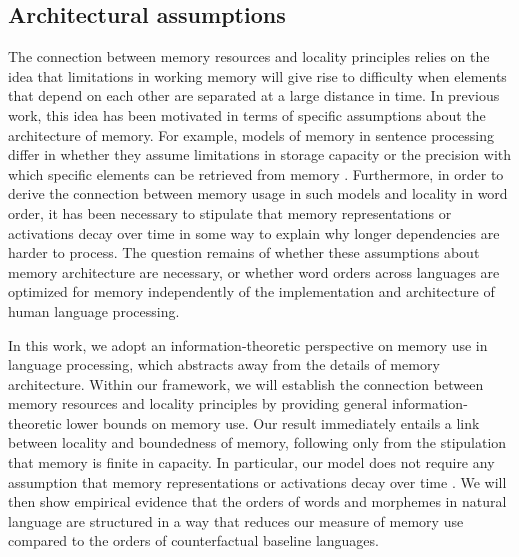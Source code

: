 \subsection{Architectural assumptions}

The connection between memory resources and locality principles relies on the idea that limitations in working memory will give rise to difficulty when elements that depend on each other are separated at a large distance in time. In previous work, this idea has been motivated in terms of specific assumptions about the architecture of memory. For example, models of memory in sentence processing differ in whether they assume limitations in storage capacity \citep[e.g., `memory cost' in the model of][]{gibson1998linguistic} or the precision with which specific elements can be retrieved from memory \citep[e.g.][]{lewis-activation-based-2005}. Furthermore, in order to derive the connection between memory usage in such models and locality in word order, it has been necessary to stipulate that memory representations or activations decay over time in some way to explain why longer dependencies are harder to process.
The question remains of whether these assumptions about memory architecture are necessary, or whether word orders across languages are optimized for memory independently of the implementation and architecture of human language processing.

In this work, we adopt an information-theoretic perspective on memory use in language processing, which abstracts away from the details of memory architecture. 
Within our framework, we will establish the connection between memory resources and locality principles by providing general information-theoretic lower bounds on memory use.
Our result immediately entails a link between locality and boundedness of memory, following only from the stipulation that memory is finite in capacity. 
In particular, our model does not require any assumption that memory representations or activations decay over time \citep[as was required in previous work:][]{gibson1998linguistic, lewis-activation-based-2005, futrell2020lossy}.
We will then show empirical evidence that the orders of words and morphemes in natural language are structured in a way that reduces our measure of memory use compared to the orders of counterfactual baseline languages.

